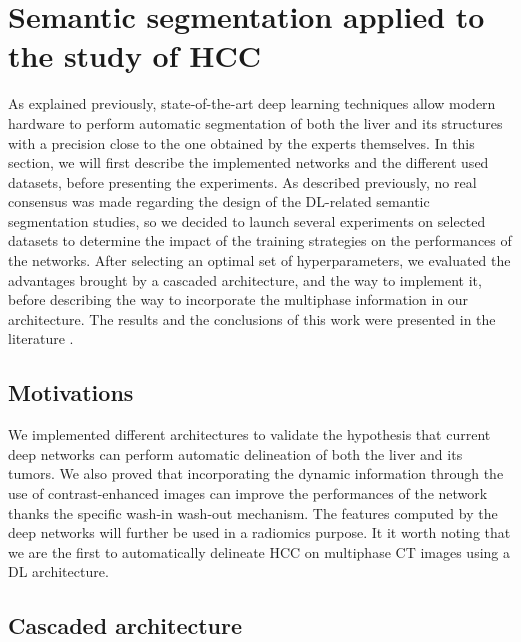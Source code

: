 \section{Semantic segmentation applied to the study of HCC}

As explained previously, state-of-the-art deep learning techniques allow
modern hardware to perform automatic segmentation of both the liver and
its structures with a precision close to the one obtained by the experts
themselves.
In this section, we will first describe the implemented
networks and the different used datasets, before presenting the experiments.
As described previously, no real consensus was made regarding the
design of the DL-related semantic segmentation studies, so we decided to
launch several experiments on selected datasets to determine the impact
of the training strategies on the performances of the networks.
After selecting an optimal set of hyperparameters, we evaluated the
advantages brought by a cascaded architecture, and the way to implement
it, before describing the way to incorporate the multiphase information
in our architecture.
The results and the conclusions of this work were presented in the
literature \cite{Ouhmich2019}.


\subsection{Motivations}

We implemented different architectures to validate the hypothesis that
current deep networks can perform automatic delineation of both the
liver and its tumors. We also proved that incorporating the dynamic information through the use of contrast-enhanced images can improve the performances of the network thanks the specific wash-in wash-out mechanism. 
The features computed by the deep networks will further be used in a
radiomics purpose.
It it worth noting that we are the first to automatically delineate HCC on multiphase CT images using a DL architecture.



\subsection{Cascaded architecture}

